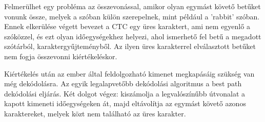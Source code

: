 Felmerülhet egy probléma az összevonással, amikor olyan egymást követő betűket vonunk össze, melyek a szóban külön szerepelnek, mint például a ’rabbit’ szóban. Ennek elkerülése végett bevezet a CTC egy üres karaktert, ami nem egyenlő a szóközzel, és ezt olyan időegységekhez helyezi, ahol ismerhető fel betű a megadott szótárból, karaktergyűjteményből. Az ilyen üres karakterrel elválasztott betűket nem fogja összevonni kiértékeléskor.

Kiértékelés után az ember által feldolgozható kimenet megkapásáig szükség van még dekódolásra. Az egyik legalapvetőbb dekódolási algoritmus a best path dekódolási eljárás. Két dolgot végez: kiszámolja a legvalószínűbb útvonalat a kapott kimeneti időegységeken át, majd eltávolítja az egymást követő azonos karaktereket, melyek közt nem található az üres karakter.
